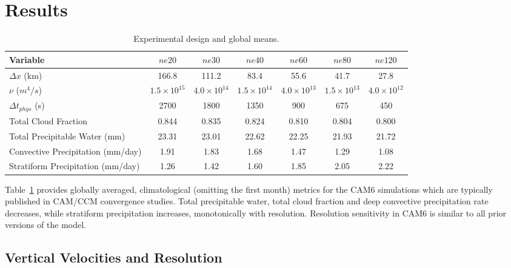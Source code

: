 \section{Results}

 \begin{table}
 \caption{Experimental design and global means.}
 \centering
 \scriptsize
 \begin{tabular}{lcccccc}
   \hline
   Variable & $ne20$ & $ne30$ & $ne40$ & $ne60$ & $ne80$ & $ne120$ \\ 
   \hline
   $\Delta x$ (km) & 166.8 & 111.2 & 83.4 & 55.6 & 41.7 & 27.8 \\
   $\nu$ ($m^4/s$) & $1.5 \times 10^{15}$ & $4.0 \times 10^{14}$ & $1.5 \times 10^{14}$ & $4.0 \times 10^{13}$  & $1.5 \times 10^{13}$ & $4.0 \times 10^{12}$\\
    $\Delta t_{phys}$ (s) & 2700 & 1800 & 1350 & 900 & 675 & 450 \\
   Total Cloud Fraction & 0.844 & 0.835 & 0.824 & 0.810 & 0.804 & 0.800 \\ 
   Total Precipitable Water (mm) & 23.31& 23.01 & 22.62 & 22.25 & 21.93 & 21.72 \\
   Convective Precipitation (mm/day) & 1.91 & 1.83 & 1.68 & 1.47 & 1.29 & 1.08 \\
   Stratiform Precipitation (mm/day) & 1.26 & 1.42 & 1.60 & 1.85 & 2.05 & 2.22 \\      
 \hline
 \end{tabular}
 \label{tbl:table1}
 \end{table}

Table~\ref{tbl:table1} provides globally averaged, climatological (omitting the first month) metrics for the CAM6 simulations which are typically published in CAM/CCM convergence studies. Total precipitable water, total cloud fraction and deep convective precipitation rate decreases, while stratiform precipitation increases, monotonically with resolution. Resolution sensitivity in CAM6 is similar to all prior versions of the model. 

\subsection{Vertical Velocities and Resolution}

